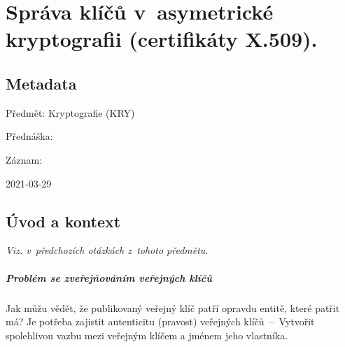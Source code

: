 

\graphicspath{{kry/sprava_klicu_v_asymetricke}}


\chapter{Správa klíčů v~asymetrické kryptografii (certifikáty X.509).}


\section{Metadata}

\begin{compactitem}
    \item Předmět: Kryptografie (KRY)
    \item Přednáška:
    \begin{compactitem}
        \item {}
    \end{compactitem}
    \item Záznam:
    \begin{compactitem}
        \item 2021-03-29
    \end{compactitem}
\end{compactitem}


\section{Úvod a kontext}

\textit{Viz.  v~předchozích otázkách z~tohoto předmětu.}

\paragraph*{Problém se zveřejňováním veřejných klíčů} Jak můžu vědět, že publikovaný veřejný klíč patří opravdu entitě, které patřit má? Je potřeba zajistit autenticitu (pravost) veřejných klíčů~--~Vytvořit spolehlivou vazbu mezi veřejným klíčem a jménem jeho vlastníka.

